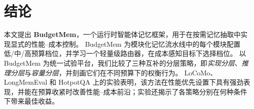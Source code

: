 \section{结论}
\label{sec:conclusion}

本文提出 \textbf{BudgetMem}，一个运行时智能体记忆框架，用于在按需记忆抽取中实现显式的性能--成本控制。
BudgetMem 为模块化记忆流水线中的每个模块配置 \textsc{低}/\textsc{中}/\textsc{高}预算档位，并学习一个轻量级路由器，在成本感知目标下选择档位。
以 BudgetMem 为统一试验平台，我们比较了三种互补的分层策略，即\textit{实现分层}、\textit{推理分层}与\textit{容量分层}，并刻画它们在不同预算下的权衡行为。
LoCoMo、LongMemEval 和 HotpotQA 上的实验表明，该方法在性能优先设置下具有强劲表现，并能在预算收紧时改善性能--成本前沿；实验还揭示了各策略分别在何种条件下带来最佳收益。
